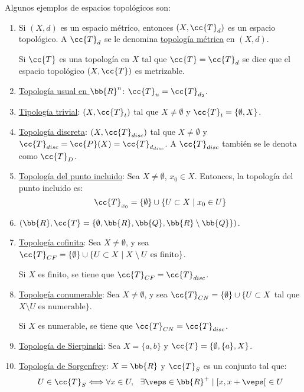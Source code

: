 \begin{ejemplo} Algunos ejemplos de espacios topológicos son:
    \begin{enumerate}
        \item Si $(X,d)$ es un espacio métrico, entonces $(X,\cc{T}_d)$ es un espacio topológico. A $\cc{T}_d$ se le denomina \ul{topología métrica} en $(X,d)$.

        Si $\cc{T}$ es una topología en $X$ tal que $\cc{T}=\cc{T}_d$ se dice que el espacio topológico $(X,\cc{T})$ es metrizable.

        \item \ul{Topología usual en $\bb{R}^n$}:  $\cc{T}_u=\cc{T}_{d_2}$.

        \item \ul{Tipología trivial}: $(X,\cc{T}_t)$ tal que $X\neq \emptyset$ y $\cc{T}_t=\{\emptyset, X\}$.

        \item \ul{Topología discreta}: $(X,\cc{T}_{disc})$ tal que $X\neq \emptyset$ y $\cc{T}_{disc}=\cc{P}(X)=\cc{T}_{d_{disc}}$. A $\cc{T}_{disc}$ también se le denota como $\cc{T}_D$.

        \item \ul{Topología del punto incluido}: Sea $X\neq \emptyset$, $x_0\in X$. Entonces, la topología del punto incluido es:
        \begin{equation*}
            \cc{T}_{x_0}=\{\emptyset\}\cup \{U\subset X\mid x_0\in U\}
        \end{equation*}

        \item $(\bb{R}, \cc{T}=\{\emptyset, \bb{R}, \bb{Q}, \bb{R}\setminus \bb{Q}\})$.

        \item \ul{Topología cofinita}: Sea $X\neq \emptyset$, y sea $\cc{T}_{CF}=\{\emptyset\}\cup \{U\subset X\mid X\setminus U \text{ es finito}\}$.

        Si $X$ es finito, se tiene que $\cc{T}_{CF}=\cc{T}_{disc}$.

        \item \ul{Topología conumerable}: Sea $X\neq \emptyset$, y sea $\cc{T}_{CN}=\{\emptyset\}\cup \{U\subset X$ tal que $X\setminus U \text{ es numerable}\}$.

        Si $X$ es numerable, se tiene que $\cc{T}_{CN}=\cc{T}_{disc}$.

        \item \ul{Topología de Sierpinski}: Sea $X=\{a,b\}$ y $\cc{T}=\{\emptyset, \{a\}, X\}$.

        \item \ul{Topología de Sorgenfrey}: $X=\bb{R}$ y $\cc{T}_S$ es un conjunto tal que:
        \begin{equation*}
            U\in \cc{T}_S \Longleftrightarrow \forall x\in U,~~\exists \veps\in \bb{R}^+ \mid [x,x+\veps[~\in U
        \end{equation*}
    \end{enumerate}
\end{ejemplo}

